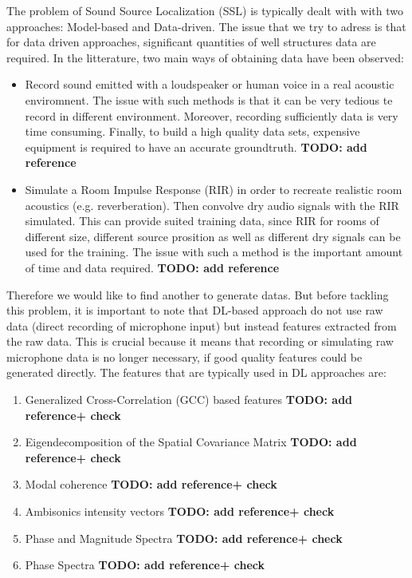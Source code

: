 \documentclass{article}
\begin{document}
The problem of Sound Source Localization (SSL) is typically dealt with with two approaches: Model-based and Data-driven. The issue that we try to adress is that for data driven approaches, significant quantities of well structures data are required. In the litterature, two main ways of obtaining data have been observed:

\begin{itemize}
    \item Record sound emitted with a loudspeaker or human voice in a real acoustic enviromnent. The issue with such methods is that it can be very tedious te record in different environment. Moreover, recording sufficiently data is very time consuming. Finally, to build a high quality data sets, expensive equipment is required to have an accurate groundtruth. \textbf{TODO: add reference}
    \item Simulate a Room Impulse Response (RIR) in order to recreate realistic room acoustics (e.g. reverberation). Then convolve dry audio signals with the RIR simulated. This can provide suited training data, since RIR for rooms of different size, different source prosition as well as different dry signals can be used for the training. The issue with such a method is the important amount of time and data required. \textbf{TODO: add reference}
\end{itemize}


Therefore we would like to find another to generate datas. But before tackling this problem, it is important to note that DL-based approach do not use raw data (direct recording of microphone input) but instead features extracted from the raw data. This is crucial because it means that recording or simulating raw microphone data is no longer necessary, if good quality features could be generated directly. The features that are typically used in DL approaches are:

\begin{enumerate}
    \item Generalized Cross-Correlation (GCC) based features \textbf{TODO: add reference+ check}
    \item Eigendecomposition of the Spatial Covariance Matrix \textbf{TODO: add reference+ check}
    \item Modal coherence \textbf{TODO: add reference+ check}
    \item Ambisonics intensity vectors \textbf{TODO: add reference+ check}
    \item Phase and Magnitude Spectra \textbf{TODO: add reference+ check}
    \item Phase Spectra \textbf{TODO: add reference+ check}
\end{enumerate}

%

 
\end{document}
